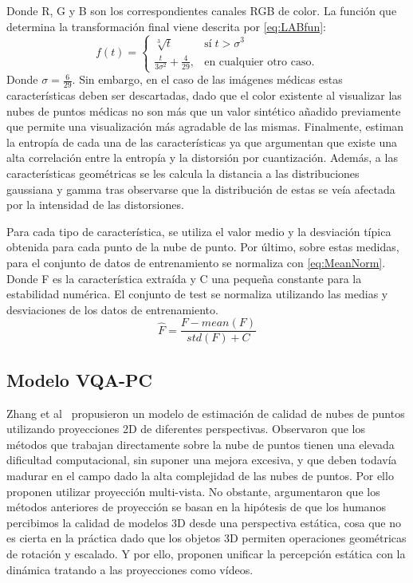 Donde R, G y B son los correspondientes canales RGB de color. La función que 
determina la transformación final viene descrita por \eqref{eq:LABfun}: 
\begin{equation}
  f(t) = \begin{cases} \sqrt[3]{t} & \textrm{sí}\; t > \sigma^3 \\ 
    \frac{t}{3\sigma^2} + \frac{4}{29},& \textrm{en cualquier otro caso.}
         \end{cases}  
  \label{eq:LABfun}
\end{equation}
Donde $\sigma = \frac{6}{29}$.
Sin embargo, en el caso de las imágenes médicas estas características deben 
ser descartadas, dado que el color existente al visualizar las nubes de puntos 
médicas no son más que un valor sintético añadido previamente que permite 
una visualización más agradable de las mismas. 
Finalmente, estiman la entropía de cada una de las características 
ya que argumentan que existe una alta correlación entre la 
entropía y la distorsión por cuantización. 
Además, a las características geométricas se les calcula 
la distancia a las distribuciones gaussiana y gamma tras observarse 
que la distribución de estas se veía afectada por la intensidad 
de las distorsiones. 

Para cada tipo de característica, se utiliza el valor medio y la desviación típica 
obtenida para cada punto de la nube de punto. Por último, sobre estas medidas, 
para el conjunto de datos de entrenamiento se normaliza con \eqref{eq:MeanNorm}.
Donde F es la característica extraída y C una pequeña constante para la 
estabilidad numérica. El conjunto de test se normaliza utilizando las medias y 
desviaciones de los datos de entrenamiento.
\begin{equation} 
  \hat F = \frac{F-mean(F)}{std(F) + C}
  \label{eq:MeanNorm}
\end{equation}


\subsection{Modelo VQA-PC}
Zhang et al~\cite{VQA-PC} propusieron un modelo de estimación de calidad de nubes 
de puntos utilizando proyecciones 2D de diferentes perspectivas. 
Observaron que los métodos que trabajan directamente sobre la nube de puntos tienen
una elevada dificultad computacional, sin suponer una mejora excesiva, y que 
deben todavía madurar en el campo dado la alta complejidad de las nubes de puntos.
Por ello proponen utilizar proyección multi-vista. No obstante, argumentaron que 
los métodos anteriores de proyección se basan en la hipótesis de que los humanos 
percibimos la calidad de modelos 3D desde una perspectiva estática, cosa que no 
es cierta en la práctica dado que los objetos 3D permiten operaciones geométricas 
de rotación y escalado.
Y por ello, proponen unificar la percepción estática con la dinámica tratando 
a las proyecciones como vídeos.

